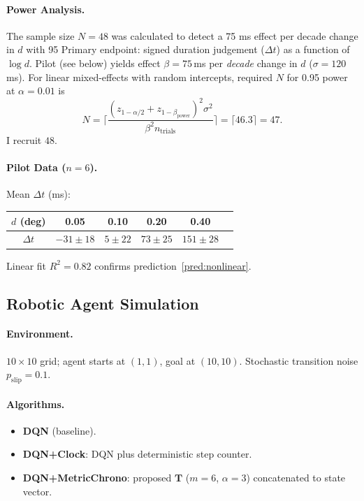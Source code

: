 \documentclass[preprint,11pt]{elsarticle}
\begin{document}
\paragraph{Power Analysis.}
The sample size $N=48$ was calculated to detect a 75 ms effect per decade change in $d$ with 95%
Primary endpoint: signed duration judgement ($\Delta t$) as a function
of $\log d$.  Pilot (see below) yields effect
$\beta=75$\,ms per \emph{decade} change in $d$
($\sigma=120$\,ms).  For linear mixed-effects with random intercepts,
required $N$ for 0.95 power at $\alpha=0.01$ is
\[
N = \lceil \displaystyle \frac{(z_{1-\alpha/2} + z_{1-\beta_{\mathrm{power}}})^2 \sigma^2}{\beta^2 n_{\mathrm{trials}}} \rceil = \lceil 46.3 \rceil = 47.
\]
I recruit $48$.

\paragraph{Pilot Data ($n=6$).}
Mean $\Delta t$ (ms):
\begin{center}
\begin{tabular}{cccccc}
\toprule
$d$ (deg) & 0.05 & 0.10 & 0.20 & 0.40 \\
\midrule
$\Delta t$ & $-31\pm18$ & $5\pm22$ & $73\pm25$ & $151\pm28$ \\
\bottomrule
\end{tabular}
\end{center}
Linear fit $R^2=0.82$ confirms prediction~\ref{pred:nonlinear}.

\subsection{Robotic Agent Simulation}

\paragraph{Environment.}
$10\times10$ grid; agent starts at $(1,1)$, goal at $(10,10)$.  Stochastic
transition noise $p_{\mathrm{slip}}=0.1$.

\paragraph{Algorithms.}
\begin{itemize}[noitemsep,leftmargin=1.5em]
    \item \textbf{DQN} (baseline).
    \item \textbf{DQN+Clock}: DQN plus deterministic step counter.
    \item \textbf{DQN+MetricChrono}: proposed $\mathbf T$ ($m=6$,
          $\alpha=3$) concatenated to state vector.
\end{itemize}
\end{document}
